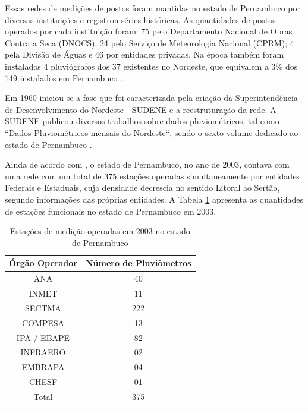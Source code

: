 Essas redes de medições de postos foram mantidas no estado de Pernambuco por diversas instituições e registrou séries históricas. As quantidades de postos operados por cada instituição foram: 75 pelo Departamento Nacional de Obras Contra a Seca (DNOCS); 24 pelo Serviço de Meteorologia Nacional (CPRM); 4 pela Divisão de Águas e 46 por entidades privadas. Na época também foram instalados 4 pluviógrafos dos 37 existentes no Nordeste, que equivalem a 3\% dos 149 instalados em Pernambuco \cite{analise-pernambuco}.

Em 1960 iniciou-se a fase que foi caracterizada pela criação da Superintendência de Desenvolvimento do Nordeste - SUDENE e a reestruturação da rede. A SUDENE publicou diversos trabalhos sobre dados pluviométricos, tal como ``Dados Pluviométricos mensais do Nordeste``, sendo o sexto volume dedicado ao estado de Pernambuco \cite{analise-pernambuco}.

Ainda de acordo com , o estado de Pernambuco, no ano de 2003, contava com uma rede com um total de 375 estações operadas simultaneamente por entidades Federais e Estaduais, cuja densidade decrescia no sentido Litoral ao Sertão, segundo informações das próprias entidades. A Tabela \ref{tab:estacoes} apresenta as quantidades de estações funcionais no estado de Pernambuco em 2003.

\begin{table}[htbp]
\centering
\caption{Estações de medição operadas em 2003 no estado de Pernambuco}
\begin{tabular}{@{}cc@{}}
\toprule
Órgão Operador & Número de Pluviômetros \\ \midrule
ANA            & 40                     \\
INMET          & 11                     \\
SECTMA         & 222                    \\
COMPESA        & 13                     \\
IPA / EBAPE    & 82                     \\
INFRAERO       & 02                     \\
EMBRAPA        & 04                     \\
CHESF          & 01                     \\ \midrule
Total          & 375                    \\ \bottomrule
\end{tabular}
\label{tab:estacoes}
\end{table}